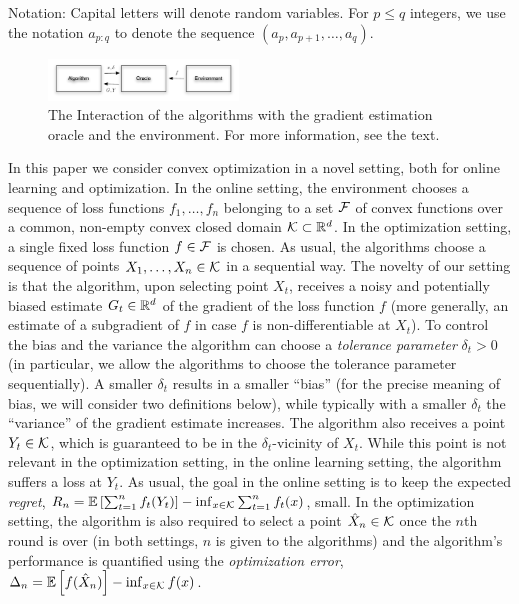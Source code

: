 
Notation: Capital letters will denote random variables.
For $p\le q$ integers, 
 we use the notation $a_{p:q}$ to denote
 the sequence $(a_p,a_{p+1}, \dots, a_{q})$.


\begin{figure}
\begin{center}
\includegraphics[width=0.45\textwidth]{figs/oracle}
\end{center}
\caption{The Interaction of the algorithms with the gradient estimation oracle and the environment. For more information, see the text.}
\label{fig:oracle}
\end{figure}

In this paper we consider convex optimization in a novel setting, both for online learning and optimization. 
In the online setting, the environment chooses a sequence of loss functions $f_1,\dots,f_n$ belonging to a set $\mathcal{F}$ of convex functions over a common, non-empty convex closed domain $\mathcal{K}\subset \mathbb{R}^d$. 
In the optimization setting, a single fixed loss function $f\in \mathcal{F}$ is chosen.
As usual, the algorithms choose a sequence of points $X_1,\dots,X_n\in \mathcal{K}$ in a sequential way. 
The novelty of our setting is that the algorithm, upon selecting point $X_t$, receives 
a noisy and potentially biased estimate $G_t\in \mathbb{R}^d$ 
of the gradient of the loss function $f$ 
(more generally, an estimate of a subgradient of $f$ in case $f$ is non-differentiable at $X_t$). 
To control the bias and the variance the algorithm can choose a \emph{tolerance parameter} $\delta_t>0$ 
(in particular, we allow the algorithms to choose the tolerance parameter sequentially). 
A smaller $\delta_t$ results in a smaller ``bias'' (for the precise meaning of bias, we will consider two definitions below), while typically with a smaller $\delta_t$ the ``variance'' of the gradient estimate increases.
The algorithm also receives a point $Y_t\in \mathcal{K}$, which is guaranteed to be in the $\delta_t$-vicinity of $X_t$. 
While this point is not relevant in the optimization setting, in the online learning setting, 
the algorithm suffers a loss at $Y_t$.
As usual, the goal in the online setting is to keep the expected \emph{regret}, 
	$R_n =\mathbb{E}\left[ \sum_{t=1}^n f_t(Y_t)\right] - \inf_{x\in \mathcal{K}} \sum_{t=1}^n f_t(x)$,
small.
In the optimization setting, the algorithm is also required to select a point $\hat{X}_n\in \mathcal{K}$ once
the $n$th round is over (in both settings, $n$ is given to the algorithms)
and the algorithm's performance is quantified using the \emph{optimization error}, 
$\Delta_n = \mathbb{E}\left[f(\hat{X}_n)\right] - \inf_{x\in \mathcal{K}} f(x) $.

